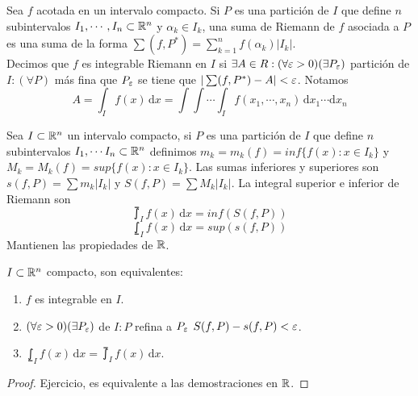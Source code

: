 \begin{definition}
  Sea $f$ acotada en un intervalo compacto. Si $P$ es una partición de $I$ que define $n$ subintervalos $I_1, \cdots, I_n \subset \mathbb{R}^n$ y $\alpha_k \in I_k$, una suma de Riemann de $f$ asociada a $P$ es una suma de la forma $\sum (f, P^*) = \sum_{k = 1}^n f(\alpha_k) |I_k|$. \\
  Decimos que $f$ es integrable Riemann en $I$ si $\exists A \in R : (\forall \varepsilon > 0)(\exists P_{\varepsilon})$ partición de $I : (\forall P)$ más fina que $P_{\varepsilon}$ se tiene que $|\sum(f, P^*) - A| < \varepsilon$.
  Notamos \begin{equation}
    A =  \int_I f(x) \, \mathrm{d}x = \int \int \cdots \int_I f(x_1, \cdots, x_n)\, \mathrm{d}x_1 \cdots \mathrm{d}x_n
  \end{equation}
\end{definition}

\begin{definition}
  Sea $I \subset \mathbb{R}^n$ un intervalo compacto, si $P$ es una partición de $I$ que define $n$ subintervalos $I_1, \cdots I_n \subset \mathbb{R}^n$ definimos $m_k = m_k(f) = inf\{f(x) : x \in I_k\}$ y $M_k = M_k(f) = sup\{f(x) : x \in I_k\}$.
  Las sumas inferiores y superiores son $s(f, P) = \sum m_k |I_k|$ y $S(f, P) = \sum M_k |I_k|$.
  La integral superior e inferior de Riemann son \begin{equation}
    \upint_I f(x) \, \mathrm{d}x = inf(S(f, P))
  \end{equation}
  \begin{equation}
    \lowint_I f(x)\, \mathrm{d}x = sup(s(f, P))
  \end{equation}
  Mantienen las propiedades de $\mathbb{R}$.
\end{definition}

\begin{theorem}
  $I \subset \mathbb{R}^n$ compacto, son equivalentes:
  \begin{enumerate}
    \item $f$ es integrable en $I$.
    \item $(\forall \varepsilon > 0)(\exists P_{\varepsilon})$ de $I : P$ refina a $P_{\varepsilon}$ $S(f, P) - s(f, P) < \varepsilon$.
    \item $\lowint_I f(x) \, \mathrm{d}x = \upint_I f(x) \, \mathrm{d}x$.
  \end{enumerate}
  \begin{proof}
    Ejercicio, es equivalente a las demostraciones en $\mathbb{R}$.
  \end{proof}
\end{theorem}

